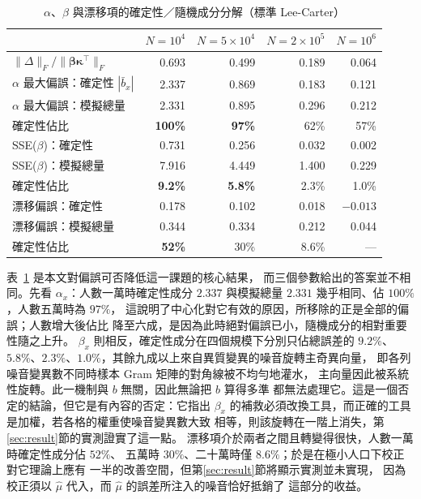 \documentclass[UTF8, fontset=macnew, a4paper, 12pt]{ctexart}
\begin{document}
\begin{table}[H]
\centering
\caption{$\alpha$、$\beta$ 與漂移項的確定性／隨機成分分解（標準 Lee-Carter）}
\small
\begin{tabular}{lrrrr}
\toprule
 & $N=10^4$ & $N=5\times10^4$ & $N=2\times10^5$ & $N=10^6$\\
\midrule
$\|\Delta\|_F/\|\boldsymbol\beta\boldsymbol\kappa^{\top}\|_F$
 & 0.693 & 0.499 & 0.189 & 0.064\\
\midrule
$\alpha$ 最大偏誤：確定性 $|\bar b_x|$ & 2.337 & 0.869 & 0.183 & 0.121\\
$\alpha$ 最大偏誤：模擬總量 & 2.331 & 0.895 & 0.296 & 0.212\\
\quad 確定性佔比 & \textbf{100\%} & \textbf{97\%} & 62\% & 57\%\\
\midrule
SSE($\beta$)：確定性 & 0.731 & 0.256 & 0.032 & 0.002\\
SSE($\beta$)：模擬總量 & 7.916 & 4.449 & 1.400 & 0.229\\
\quad 確定性佔比 & \textbf{9.2\%} & \textbf{5.8\%} & 2.3\% & 1.0\%\\
\midrule
漂移偏誤：確定性 & 0.178 & 0.102 & 0.018 & $-0.013$\\
漂移偏誤：模擬總量 & 0.344 & 0.334 & 0.212 & 0.044\\
\quad 確定性佔比 & \textbf{52\%} & 30\% & 8.6\% & ---\\
\bottomrule
\end{tabular}
\label{tab:betadec}
\end{table}

表~\ref{tab:betadec} 是本文對偏誤可否降低這一課題的核心結果，
而三個參數給出的答案並不相同。先看 $\alpha_x$：人數一萬時確定性成分
$2.337$ 與模擬總量 $2.331$ 幾乎相同、佔 $100\%$，人數五萬時為 $97\%$，
這說明了中心化對它有效的原因，所移除的正是全部的偏誤；人數增大後佔比
降至六成，是因為此時絕對偏誤已小，隨機成分的相對重要性隨之上升。
$\beta_x$ 則相反，確定性成分在四個規模下分別只佔總誤差的 $9.2\%$、
$5.8\%$、$2.3\%$、$1.0\%$，其餘九成以上來自異質變異的噪音旋轉主奇異向量，
即各列噪音變異數不同時樣本 Gram 矩陣的對角線被不均勻地灌水，
主向量因此被系統性旋轉。此一機制與 $b$ 無關，因此無論把 $b$ 算得多準
都無法處理它。這是一個否定的結論，但它是有內容的否定：它指出 $\beta_x$
的補救必須改換工具，而正確的工具是加權，若各格的權重使噪音變異數大致
相等，則該旋轉在一階上消失，第\ref{sec:result}節的實測證實了這一點。
漂移項介於兩者之間且轉變得很快，人數一萬時確定性成分佔 $52\%$、
五萬時 $30\%$、二十萬時僅 $8.6\%$；於是在極小人口下校正對它理論上應有
一半的改善空間，但第\ref{sec:result}節將顯示實測並未實現，
因為校正須以 $\hat\mu$ 代入，而 $\hat\mu$ 的誤差所注入的噪音恰好抵銷了
這部分的收益。
\end{document}
